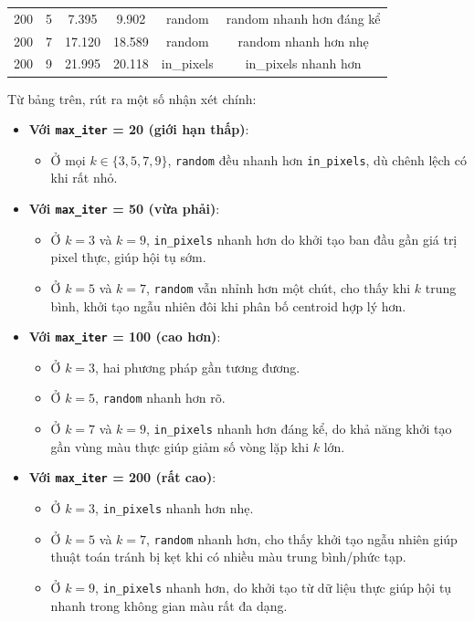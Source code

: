 \begin{table}[H]
\begin{tabular}{|c|c|c|c|c|c|}
    200                & 5     & 7.395           & 9.902               & random                & random nhanh hơn đáng kể     \\
    200                & 7     & 17.120          & 18.589              & random                & random nhanh hơn nhẹ         \\
    200                & 9     & 21.995          & 20.118              & in\_pixels            & in\_pixels nhanh hơn         \\
    \bottomrule
  \end{tabular}
  \label{tab:compare_init}
\end{table}

Từ bảng trên, rút ra một số nhận xét chính:

\begin{itemize}
  \item \textbf{Với \texttt{max\_iter} = 20 (giới hạn thấp)}:
        \begin{itemize}
          \item Ở mọi \(k \in \{3,5,7,9\}\), \texttt{random} đều nhanh hơn \texttt{in\_pixels}, dù chênh lệch có khi rất nhỏ.
        \end{itemize}

  \item \textbf{Với \texttt{max\_iter} = 50 (vừa phải)}:
        \begin{itemize}
          \item Ở \(k=3\) và \(k=9\), \texttt{in\_pixels} nhanh hơn do khởi tạo ban đầu gần giá trị pixel thực, giúp hội tụ sớm.
          \item Ở \(k=5\) và \(k=7\), \texttt{random} vẫn nhỉnh hơn một chút, cho thấy khi \(k\) trung bình, khởi tạo ngẫu nhiên đôi khi phân bố centroid hợp lý hơn.
        \end{itemize}

  \item \textbf{Với \texttt{max\_iter} = 100 (cao hơn)}:
        \begin{itemize}
          \item Ở \(k=3\), hai phương pháp gần tương đương.
          \item Ở \(k=5\), \texttt{random} nhanh hơn rõ.
          \item Ở \(k=7\) và \(k=9\), \texttt{in\_pixels} nhanh hơn đáng kể, do khả năng khởi tạo gần vùng màu thực giúp giảm số vòng lặp khi \(k\) lớn.
        \end{itemize}

  \item \textbf{Với \texttt{max\_iter} = 200 (rất cao)}:
        \begin{itemize}
          \item Ở \(k=3\), \texttt{in\_pixels} nhanh hơn nhẹ.
          \item Ở \(k=5\) và \(k=7\), \texttt{random} nhanh hơn, cho thấy khởi tạo ngẫu nhiên giúp thuật toán tránh bị kẹt khi có nhiều màu trung bình/phức tạp.
          \item Ở \(k=9\), \texttt{in\_pixels} nhanh hơn, do khởi tạo từ dữ liệu thực giúp hội tụ nhanh trong không gian màu rất đa dạng.
        \end{itemize}


\end{itemize}
